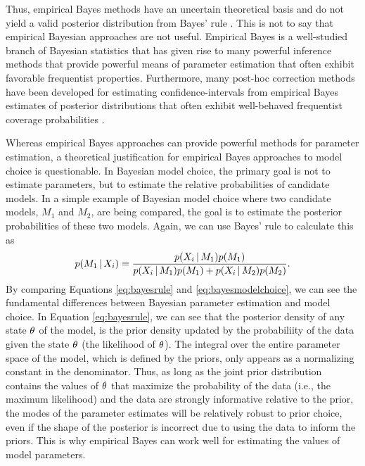 Thus, empirical Bayes methods have an uncertain theoretical basis and
do not yield a valid posterior distribution from Bayes' rule \citep[e.g.,
empirical Bayesian estimates of the posterior are often too narrow, off-center,
and incorrectly shaped;][]{Morris1983,Laird1987,Carlin1990,Efron2013}.
This is not to say that empirical Bayesian approaches are not useful.
Empirical Bayes is a well-studied branch of Bayesian statistics that has given
rise to many powerful inference methods that provide powerful means of
parameter estimation that often exhibit favorable frequentist properties.
Furthermore, many post-hoc correction methods have been developed for
estimating confidence-intervals from empirical Bayes estimates of posterior
distributions that often exhibit well-behaved frequentist coverage
probabilities
\citep{Morris1983,Laird1987,Laird1989, Carlin1990,Hwang2009}.

Whereas empirical Bayes approaches can provide powerful methods for parameter
estimation, a theoretical justification for empirical Bayes approaches to model
choice is questionable.
In Bayesian model choice, the primary goal is not to estimate parameters, but
to estimate the relative probabilities of candidate models.
In a simple example of Bayesian model choice where two candidate models, $M_1$
and $M_2$, are being compared, the goal is to estimate the posterior
probabilities of these two models.
Again, we can use Bayes' rule to calculate this as
\begin{equation}
    p(M_1 \given \alignment{i}{}) = \frac{p(\alignment{i}{} \given
    M_1)p(M_1)}{p(\alignment{i}{} \given M_1)p(M_1) + p(\alignment{i}{} \given
    M_2)p(M_2)}.
    \label{eq:bayesmodelchoice}
\end{equation}
By comparing Equations \ref{eq:bayesrule} and \ref{eq:bayesmodelchoice}, we
can see the fundamental differences between Bayesian parameter estimation and
model choice.
In Equation \ref{eq:bayesrule}, we can see that the posterior density of any
state $\theta_{}$ of the model, is the prior density updated by the
probabiliity of the data given the state $\theta_{}$ (the likelihood of
$\theta_{}$).
The integral over the entire parameter space of the model, which is defined by
the priors, only appears as a normalizing constant in the denominator.
Thus, as long as the joint prior distribution contains the values of $\theta_{}$
that maximize the probability of the data (i.e., the maximum likelihood) and the
data are strongly informative relative to the prior, the modes of the parameter
estimates will be relatively robust to prior choice, even if the shape of the
posterior is incorrect due to using the data to inform the priors.
This is why empirical Bayes can work well for estimating the values of model
parameters.

